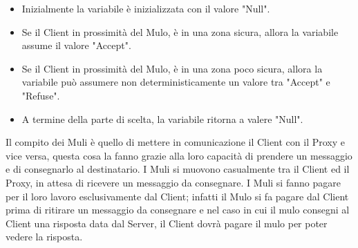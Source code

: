 \documentclass[13pt,a4paper]{article}
\begin{document}
\begin{itemize}
\begin{itemize}
	\begin{itemize}
		\item Inizialmente la variabile è inizializzata con il valore "Null".
		\item Se il Client in prossimità del Mulo,  è in una zona sicura, allora la variabile assume il valore "Accept". 
		\item Se il Client in prossimità del Mulo, è in una zona poco sicura, allora la variabile può assumere non deterministicamente un valore tra "Accept" e "Refuse".
		\item A termine della parte di scelta, la variabile ritorna a valere "Null".
	\end{itemize}
	\end{itemize}
	Il compito dei Muli è  quello di mettere in comunicazione il Client con il Proxy e vice versa, questa cosa la fanno grazie alla loro capacità di prendere un messaggio e di consegnarlo al destinatario. I Muli si muovono casualmente tra il Client ed il Proxy, in attesa di ricevere un messaggio da consegnare. I Muli si fanno pagare per il loro lavoro esclusivamente dal Client; infatti il Mulo si fa pagare dal Client prima di ritirare un messaggio da consegnare e nel caso in cui il mulo consegni al Client una risposta data dal Server, il Client dovrà pagare il mulo per poter vedere la risposta.
	

\end{itemize}
\end{document}
